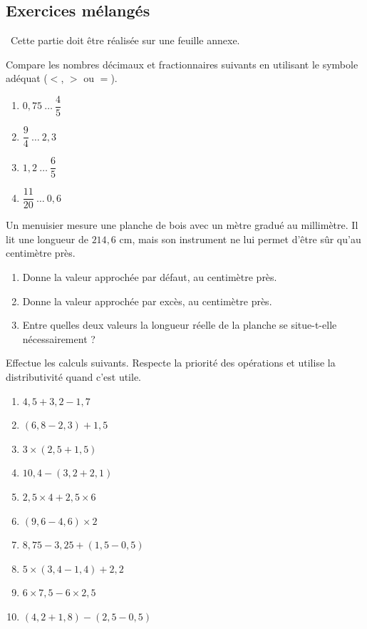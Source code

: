 \documentclass[../../syllabus_1.tex]{subfiles}
\begin{document}
\begin{itemize}
\newpage
\section{Exercices mélangés}
~Cette partie doit être réalisée sur une feuille annexe.
\setcounter{exercise}{0}

\begin{exercise}
    Compare les nombres décimaux et fractionnaires suivants en utilisant le symbole adéquat ($<$, $>$ ou $=$).
    \begin{enumerate}[cols=2]
        \item $0{,}75 \ \dots \ \dfrac{4}{5}$
        \item $\dfrac{9}{4} \ \dots \ 2{,}3$
        \item $1{,}2 \ \dots \ \dfrac{6}{5}$
        \item $\dfrac{11}{20} \ \dots \ 0{,}6$
    \end{enumerate}
\end{exercise}

\begin{exercise}
    Un menuisier mesure une planche de bois avec un mètre gradué au millimètre. Il lit une longueur de $214{,}6$ cm, mais son instrument ne lui permet d'être sûr qu'au centimètre près.
    \begin{enumerate}
        \item Donne la valeur approchée par défaut, au centimètre près.
        \item Donne la valeur approchée par excès, au centimètre près.
        \item Entre quelles deux valeurs la longueur réelle de la planche se situe-t-elle nécessairement ?
    \end{enumerate}
\end{exercise}

\begin{exercise}
    Effectue les calculs suivants. Respecte la priorité des opérations et utilise la distributivité quand c'est utile.
    \begin{enumerate}[cols=2]
        \item $4{,}5 + 3{,}2 - 1{,}7 $
        \item $\left(6{,}8 - 2{,}3\right) + 1{,}5 $
        \item $3 \times \left(2{,}5 + 1{,}5\right) $
        \item $10{,}4 - \left(3{,}2 + 2{,}1\right) $
        \item $2{,}5 \times 4 + 2{,}5 \times 6 $
        \item $\left(9{,}6 - 4{,}6\right) \times 2 $
        \item $8{,}75 - 3{,}25 + \left(1{,}5 - 0{,}5\right) $
        \item $5 \times \left(3{,}4 - 1{,}4\right) + 2{,}2 $
        \item $6 \times 7{,}5 - 6 \times 2{,}5 $
        \item $\left(4{,}2 + 1{,}8\right) - \left(2{,}5 - 0{,}5\right) $
    \end{enumerate}
\end{exercise}


\end{itemize}
\end{document}
